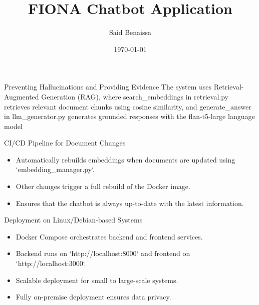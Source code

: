 \documentclass{beamer}
\title{FIONA Chatbot Application}
\author{Said Benaissa}
\date{\today}
\begin{document}
\frame{\titlepage}

\begin{frame}{Preventing Hallucinations and Providing Evidence}
    The system uses Retrieval-Augmented Generation (RAG), where search_embeddings in retrieval.py retrieves 
    relevant document chunks using cosine similarity, and generate_answer in llm_generator.py generates grounded responses with the flan-t5-large language model
\end{frame}

\begin{frame}{CI/CD Pipeline for Document Changes}
    \begin{itemize}
        \item Automatically rebuilds embeddings when documents are updated using `embedding_manager.py`.
        \item Other changes trigger a full rebuild of the Docker image.
        \item Ensures that the chatbot is always up-to-date with the latest information.
    \end{itemize}
\end{frame}

\begin{frame}{Deployment on Linux/Debian-based Systems}
    \begin{itemize}
        \item Docker Compose orchestrates backend and frontend services.
        \item Backend runs on `http://localhost:8000` and frontend on `http://localhost:3000`.
        \item Scalable deployment for small to large-scale systems.
        \item Fully on-premise deployment ensures data privacy.
    \end{itemize}
\end{frame}
\end{document}
